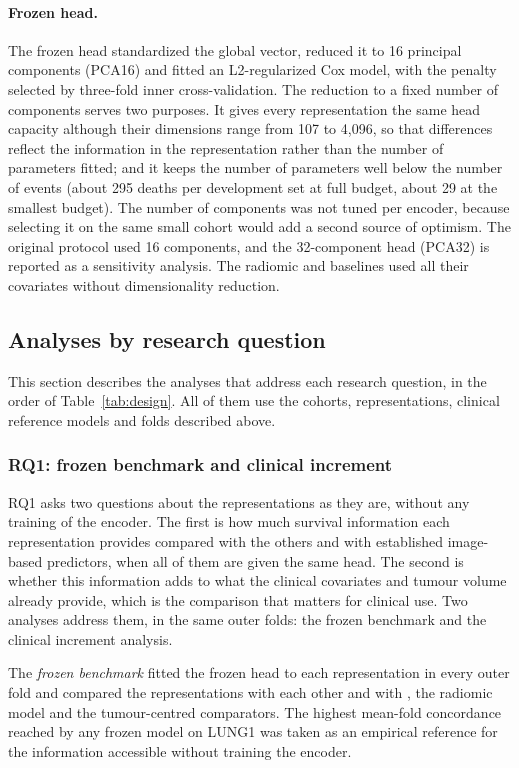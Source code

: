 \paragraph{Frozen head.} The frozen head standardized the global vector, reduced it to 16 principal components (PCA16) and fitted an L2-regularized Cox model, with the penalty selected by three-fold inner cross-validation. The reduction to a fixed number of components serves two purposes. It gives every representation the same head capacity although their dimensions range from 107 to 4,096, so that differences reflect the information in the representation rather than the number of parameters fitted; and it keeps the number of parameters well below the number of events (about 295 deaths per development set at full budget, about 29 at the smallest budget). The number of components was not tuned per encoder, because selecting it on the same small cohort would add a second source of optimism. The original protocol used 16 components, and the 32-component head (PCA32) is reported as a sensitivity analysis. The radiomic and  baselines used all their covariates without dimensionality reduction.

\subsection{Analyses by research question}\label{sec:analyses}
This section describes the analyses that address each research question, in the order of Table~\ref{tab:design}. All of them use the cohorts, representations, clinical reference models and folds described above. 

\subsubsection{RQ1: frozen benchmark and clinical increment}\label{sec:frozen}
RQ1 asks two questions about the representations as they are, without any training of the encoder. The first is how much survival information each representation provides compared with the others and with established image-based predictors, when all of them are given the same head. The second is whether this information adds to what the clinical covariates and tumour volume already provide, which is the comparison that matters for clinical use. Two analyses address them, in the same outer folds: the frozen benchmark and the clinical increment analysis.

The \emph{frozen benchmark} fitted the frozen head to each representation in every outer fold and compared the representations with each other and with , the radiomic model and the tumour-centred comparators. The highest mean-fold concordance reached by any frozen model on LUNG1 was taken as an empirical reference for the information accessible without training the encoder.

